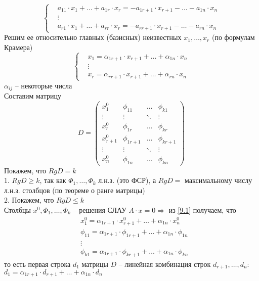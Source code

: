 \documentclass[a4paper,12pt]{article}
\begin{document}
\\
\[\left\{
\begin{aligned}
&a_{11}\cdot x_1+\ldots+a_{1r}\cdot x_r=-a_{1r+1}\cdot x_{r+1}-\ldots-a_{1n}\cdot x_n\\
&\vdots\\
&a_{r1}\cdot x_1+\ldots+a_{rr}\cdot x_r=-a_{rr+1}\cdot x_{r+1}-\ldots-a_{rn}\cdot x_n
\end{aligned}\right.
\]
Решим ее относительно главных (базисных) неизвестных $x_1, \ldots, x_r$ (по формулам Крамера)
\[\left\{
\begin{aligned}
&x_1=\alpha_{1r+1}\cdot x_{r+1}+\ldots+\alpha_{1n}\cdot x_n\\
&\vdots\\
&x_r=\alpha_{rr+1}\cdot x_{r+1}+\ldots+\alpha_{rn}\cdot x_n
\end{aligned}\right.\tag{9.1}\label{9.1}
\]
$\alpha_{ij}$ -- некоторые числа\\
Составим матрицу
\[
D=\begin{pmatrix}
x_1^0&\phi_{11}&\ldots&\phi_{k1}\\
\vdots&\vdots&\ddots&\vdots\\
x_r^0&\phi_{1r}&\ldots&\phi_{kr}\\
x_{r+1}^0&\phi_{1r+1}&\ldots&\phi_{kr+1}\\
\vdots&\vdots&\ddots&\vdots\\
x_n^0&\phi_{1n}&\ldots&\phi_{kn}
\end{pmatrix}
\]
Покажем, что $RgD=k$\\
1. $RgD\geq k$, так как $\Phi_1, \ldots, \Phi_k$ л.н.з. (это ФСР), а $RgD=$ максимальному числу л.н.з. столбцов (по теореме о ранге матрицы)\\
2. Покажем, что $RgD\leq k$\\
Столбцы $x^0, \Phi_1, \ldots, \Phi_k$ -- решения СЛАУ $A\cdot x=0\Rightarrow$ из \eqref{9.1} получаем, что
\begin{align*}
&x_1^0=\alpha_{1r+1}\cdot x_{r+1}^0+\ldots+\alpha_{1n}\cdot x_n^0\\
&\phi_{11}=\alpha_{1r+1}\cdot \phi_{1r+1}+\ldots+\alpha_{1n}\cdot \phi_{1n}\\
&\vdots\\
&\phi_{k1}=\alpha_{1r+1}\cdot \phi_{kr+1}+\ldots+\alpha_{1n}\cdot \phi_{kn}
\end{align*}
то есть первая строка $d_1$ матрицы $D$ -- линейная комбинация строк $d_{r+1}, \ldots, d_n$:\\
$d_1=\alpha_{1r+1}\cdot d_{r+1}+\ldots+\alpha_{1n}\cdot d_n$\\
\end{document}
